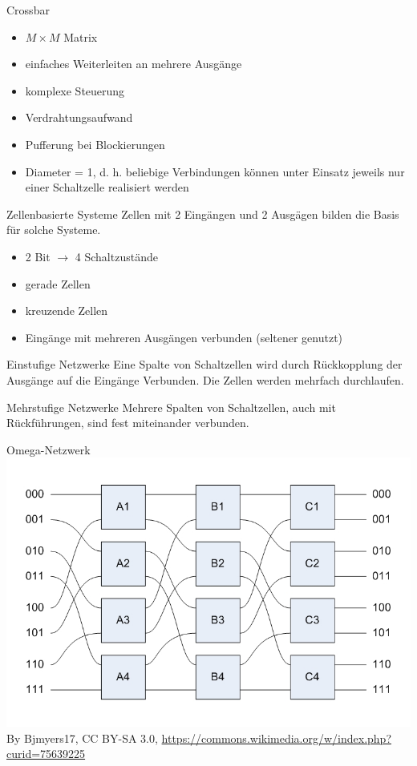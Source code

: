 \begin{defi}{Crossbar}
    \begin{itemize}
        \item $M \times M$ Matrix
        \item einfaches Weiterleiten an mehrere Ausgänge
        \item komplexe Steuerung
        \item Verdrahtungsaufwand
        \item Pufferung bei Blockierungen
        \item Diameter = 1, d. h. beliebige Verbindungen können unter Einsatz jeweils nur einer Schaltzelle realisiert werden
    \end{itemize}
\end{defi}

\begin{defi}{Zellenbasierte Systeme}
    Zellen mit 2 Eingängen und 2 Ausgägen bilden die Basis für solche Systeme.
    \begin{itemize}
        \item 2 Bit $\to$ 4 Schaltzustände
        \item gerade Zellen
        \item kreuzende Zellen
        \item Eingänge mit mehreren Ausgängen verbunden (seltener genutzt)
    \end{itemize}
\end{defi}

\begin{defi}{Einstufige Netzwerke}
    Eine Spalte von Schaltzellen wird durch Rückkopplung der Ausgänge auf die Eingänge Verbunden. 
    Die Zellen werden mehrfach durchlaufen.
\end{defi}

\begin{defi}{Mehrstufige Netzwerke}
    Mehrere Spalten von Schaltzellen, auch mit Rückführungen, 
    sind fest miteinander verbunden.
\end{defi}

\begin{defi}{Omega-Netzwerk}
    \includegraphics[width=\textwidth]{images/OmegaNetwork.jpg}
    By Bjmyers17, CC BY-SA 3.0, \url{https://commons.wikimedia.org/w/index.php?curid=75639225}
\end{defi}

